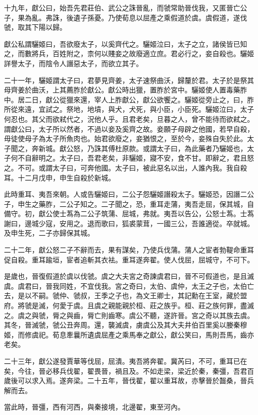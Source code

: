 十九年，獻公曰，始吾先君莊伯、武公之誅晉亂，而虢常助晉伐我，又匿晉亡公子，果為亂。弗誅，後遺子孫憂。乃使荀息以屈產之乘假道於虞。虞假道，遂伐虢，取其下陽以歸。

獻公私謂驪姬曰，吾欲廢太子，以奚齊代之。驪姬泣曰，太子之立，諸侯皆已知之，而數將兵，百姓附之，柰何以賤妾之故廢適立庶。君必行之，妾自殺也。驪姬詳譽太子，而陰令人譖惡太子，而欲立其子。

二十一年，驪姬謂太子曰，君夢見齊姜，太子速祭曲沃，歸釐於君。太子於是祭其母齊姜於曲沃，上其薦胙於獻公。獻公時出獵，置胙於宮中。驪姬使人置毒藥胙中。居二日，獻公從獵來還，宰人上胙獻公，獻公欲饗之。驪姬從旁止之，曰，胙所從來遠，宜試之。祭地，地墳，與犬，犬死，與小臣，小臣死。驪姬泣曰，太子何忍也。其父而欲弒代之，況他人乎。且君老矣，旦暮之人，曾不能待而欲弒之。謂獻公曰，太子所以然者，不過以妾及奚齊之故。妾願子母辟之他國，若早自殺，毋徒使母子為太子所魚肉也。始君欲廢之，妾猶恨之，至於今，妾殊自失於此。太子聞之，奔新城。獻公怒，乃誅其傅杜原款。或謂太子曰，為此藥者乃驪姬也，太子何不自辭明之。太子曰，吾君老矣，非驪姬，寢不安，食不甘。即辭之，君且怒之。不可。或謂太子曰，可奔他國。太子曰，被此惡名以出，人誰內我。我自殺耳。十二月戊申，申生自殺於新城。

此時重耳、夷吾來朝。人或告驪姬曰，二公子怨驪姬譖殺太子。驪姬恐，因譖二公子，申生之藥胙，二公子知之。二子聞之，恐，重耳走蒲，夷吾走屈，保其城，自備守。初，獻公使士蒍為二公子筑蒲、屈城，弗就。夷吾以告公，公怒士蒍。士蒍謝曰，邊城少寇，安用之。退而歌曰，狐裘蒙茸，一國三公，吾誰適從。卒就城。及申生死，二子亦歸保其城。

二十二年，獻公怒二子不辭而去，果有謀矣，乃使兵伐蒲。蒲人之宦者勃鞮命重耳促自殺。重耳踰垣，宦者追斬其衣袪。重耳遂奔翟。使人伐屈，屈城守，不可下。

是歲也，晉復假道於虞以伐虢。虞之大夫宮之奇諫虞君曰，晉不可假道也，是且滅虞。虞君曰，晉我同姓，不宜伐我。宮之奇曰，太伯、虞仲，太王之子也，太伯亡去，是以不嗣。虢仲、虢叔，王季之子也，為文王卿士，其記勳在王室，藏於盟府。將虢是滅，何愛于虞。且虞之親能親於桓、莊之族乎。桓、莊之族何罪，盡滅之。虞之與虢，脣之與齒，脣亡則齒寒。虞公不聽，遂許晉。宮之奇以其族去虞。其冬，晉滅虢，虢公丑奔周。還，襲滅虞，虜虞公及其大夫井伯百里奚以媵秦穆姬，而修虞祀。荀息牽曩所遺虞屈產之乘馬奉之獻公，獻公笑曰，馬則吾馬，齒亦老矣。

二十三年，獻公遂發賈華等伐屈，屈潰。夷吾將奔翟。冀芮曰，不可，重耳已在矣，今往，晉必移兵伐翟，翟畏晉，禍且及。不如走梁，梁近於秦，秦彊，吾君百歲後可以求入焉。遂奔梁。二十五年，晉伐翟，翟以重耳故，亦擊晉於齧桑，晉兵解而去。

當此時，晉彊，西有河西，與秦接境，北邊翟，東至河內。

